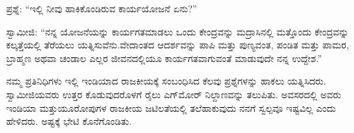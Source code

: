 ಪ್ರಶ್ನೆ: “ಇಲ್ಲಿ ನೀವು ಹಾಕಿಕೊಂಡಿರುವ ಕಾರ್ಯಯೋಜನೆ ಏನು?”

ಸ್ವಾಮೀಜಿ: “ನನ್ನ ಯೋಜನೆಯನ್ನು ಕಾರ್ಯಗತಮಾಡಲು ಒಂದು ಕೇಂದ್ರವನ್ನು ಮದ್ರಾಸಿನಲ್ಲಿ ಮತ್ತೊಂದು ಕೇಂದ್ರವನ್ನು ಕಲ್ಕತ್ತೆಯಲ್ಲಿ ತೆರೆಯಲು ಯತ್ನಿಸುವೆನು.\break ವೇದಾಂತದ ಆದರ್ಶವನ್ನು ಪಾಪಿ ಮತ್ತು ಪುಣ್ಯವಂತ, ಪಂಡಿತ ಮತ್ತು ಪಾಮರ, ಬ್ರಾಹ್ಮಣ ಅಥವಾ ಚಂಡಾಲ ಎಲ್ಲರ ಜೀವನದಲ್ಲಿಯೂ ಕಾರ್ಯಗತವಾಗುವಂತೆ ಮಾಡುವುದೇ ನನ್ನ ಉದ್ದೇಶ.”

ನಮ್ಮ ಪ್ರತಿನಿಧಿಗಳು ಇಲ್ಲಿ ಇಂಡಿಯಾದ ರಾಜಕೀಯಕ್ಕೆ ಸಂಬಂಧಿಸಿದ ಕೆಲವು ಪ್ರಶ್ನೆಗಳನ್ನು ಹಾಕಲು ಯತ್ನಿಸಿದರು. ಸ್ವಾಮೀಜಿಯವರು ಉತ್ತರ ಕೊಡುವುದರೊಳಗೆ ರೈಲು ಎಗ್​ಮೋರ್​ ನಿಲ್ದಾಣವನ್ನು ತಲುಪಿತು. ಅವಸರದಲ್ಲಿ ಅವರು ಇಂಡಿಯಾ ಮತ್ತು\break ಯೂರೋಪುಗಳ ರಾಜಕೀಯ ಜಟಿಲತೆಯಲ್ಲಿ ತಲೆಹಾಕುವುದು ನನಗೆ ಸ್ವಲ್ಪವೂ ಇಷ್ಟವಿಲ್ಲ ಎಂದು ಹೇಳಿದರು. ಅಷ್ಟಕ್ಕೆ ಭೇಟಿ ಕೊನೆಗೊಂಡಿತು.

